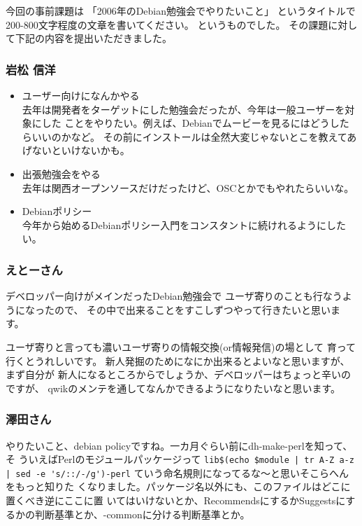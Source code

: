 \documentclass[mingoth,a4paper]{jsarticle}
\begin{document}
今回の事前課題は
「2006年のDebian勉強会でやりたいこと」
というタイトルで200-800文字程度の文章を書いてください。
というものでした。
その課題に対して下記の内容を提出いただきました。

\subsubsection{岩松 信洋}

\begin{itemize}
 
 \item  ユーザー向けになんかやる\\
  去年は開発者をターゲットにした勉強会だったが、今年は一般ユーザーを対象にした
  ことをやりたい。例えば、Debianでムービーを見るにはどうしたらいいのかなど。
  その前にインストールは全然大変じゃないとこを教えてあげないといけないかも。
  
 \item  出張勉強会をやる\\
  去年は関西オープンソースだけだったけど、OSCとかでもやれたらいいな。

 \item  Debianポリシー\\
  今年から始めるDebianポリシー入門をコンスタントに続けれるようにしたい。


\end{itemize}



\subsubsection{えとーさん}

デベロッパー向けがメインだったDebian勉強会で
ユーザ寄りのことも行なうようになったので、
その中で出来ることをすこしずつやって行きたいと思います。

ユーザ寄りと言っても濃いユーザ寄りの情報交換(or情報発信)の場として
育って行くとうれしいです。
新人発掘のためになにか出来るとよいなと思いますが、まず自分が
新人になるところからでしょうか、デベロッパーはちょっと辛いのですが、
qwikのメンテを通してなんかできるようになりたいなと思います。

\subsubsection{澤田さん}

やりたいこと、debian policyですね。一カ月ぐらい前にdh-make-perlを知って、そ
ういえばPerlのモジュールパッケージって
\verb!lib$(echo $module | tr A-Z a-z | sed -e 's/::/-/g')-perl!
ていう命名規則になってるな〜と思いそこらへんをもっと知りた
くなりました。パッケージ名以外にも、このファイルはどこに置くべき逆にここに置
いてはいけないとか、RecommendsにするかSuggestsにするかの判断基準とか、-commonに分ける判断基準とか。
\end{document}
